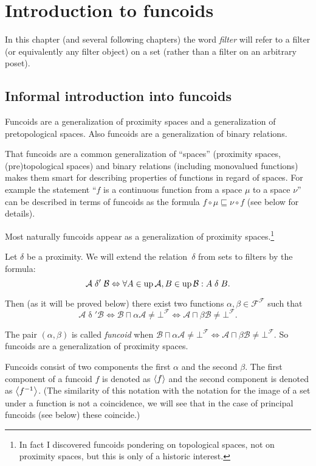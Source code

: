\chapter{Introduction to funcoids}

In this chapter (and several following chapters) the word \emph{filter}
will refer to a filter (or equivalently any filter object) on a set
(rather than a filter on an arbitrary poset).


\section{Informal introduction into funcoids}

Funcoids are a generalization of proximity spaces and a generalization
of pretopological spaces. Also funcoids are a generalization of binary
relations.

That funcoids are a common generalization of ``spaces'' (proximity
spaces, (pre)topological spaces) and binary relations (including monovalued
functions) makes them smart for describing properties of functions
in regard of spaces. For example the statement ``$f$ is a continuous
function from a space $\mu$ to a space $\nu$'' can be described
in terms of funcoids as the formula $f\circ\mu\sqsubseteq\nu\circ f$
(see below for details).

Most naturally funcoids appear as a generalization of proximity spaces.\footnote{In fact I discovered funcoids pondering on topological spaces, not on proximity spaces, but this is only of a historic interest.}

Let $\delta$ be a proximity. We will extend the relation~$\delta$
from sets to filters by the formula:
\[
\mathcal{A}\mathrel\delta'\mathcal{B}\Leftrightarrow\forall
A\in\operatorname{up}\mathcal{A},B\in\operatorname{up}\mathcal{B}:A\mathrel\delta B.
\]


Then (as it will be proved below) there exist two functions
$\alpha,\beta\in\mathscr{F}^{\mathscr{F}}$
such that
\[
\mathcal{A}\mathrel\delta'\mathcal{B}\Leftrightarrow\mathcal{B}
\sqcap\alpha\mathcal{A}\ne\bot^{\mathscr{F}}\Leftrightarrow\mathcal{A}
\sqcap\beta\mathcal{B}\ne\bot^{\mathscr{F}}.
\]


The pair $(\alpha,\beta)$ is called \emph{funcoid} when
$\mathcal{B}\sqcap\alpha\mathcal{A}\ne\bot^{\mathscr{F}}\Leftrightarrow\mathcal{
A}\sqcap\beta\mathcal{B}\ne\bot^{\mathscr{F}}$.
So funcoids are a generalization of proximity spaces.

Funcoids consist of two components the first $\alpha$ and the second
$\beta$. The first component of a funcoid $f$ is denoted as $\left\langle f\right\rangle$
and the second component is denoted as $\left\langle f^{-1}\right\rangle$. (The similarity
of this notation with the notation for the image of a set under a
function is not a coincidence, we will see that in the case of principal
funcoids (see below) these coincide.)

